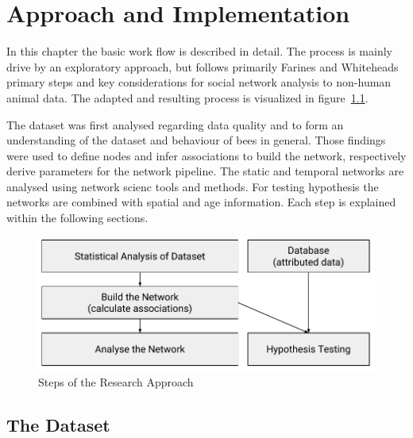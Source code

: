 \chapter{Approach and Implementation}
\label{ch:approach}
In this chapter the basic work flow is described in detail. The process is mainly drive by an exploratory approach, but follows primarily Farines and Whiteheads~\cite{farine2015constructing} primary steps and key considerations for social network analysis to non-human animal data. The adapted and resulting process is visualized in figure~\ref{fig:process}.

The dataset was first analysed regarding data quality and to form an understanding of the dataset and behaviour of bees in general. Those findings were used to define nodes and infer associations to build the network, respectively derive parameters for the network pipeline. The static and temporal networks are analysed using network scienc tools and methods. For testing hypothesis the networks are combined with spatial and age information. Each step is explained within the following sections.

\begin{figure}[htb]
	\centering
	\includegraphics[width=1.0\textwidth]{Figures/process}
	\caption{Steps of the Research Approach}
	\label{fig:process}
\end{figure}


\section{The Dataset}
\label{sec:dataset}

